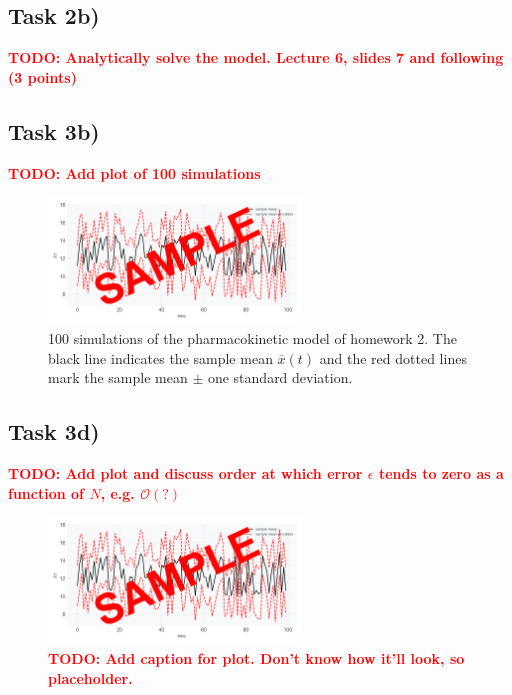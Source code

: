 \documentclass[]{scrartcl}
\begin{document}

\subsection*{Task 2b)}

\textbf{\textcolor{red}{TODO: Analytically solve the model. Lecture 6, slides 7 and following (3 points)}}




\clearpage
\subsection*{Task 3b)}

\textbf{\textcolor{red}{TODO: Add plot of 100 simulations}}

\begin{figure}[htbp!]
	\centering
	\includegraphics[width=0.6\textwidth]{Exercise3Homework3b.png}
	\caption{100 simulations of the pharmacokinetic model of homework 2.
			 The black line indicates the sample mean $\overline{x}(t)$ and the red dotted lines mark the sample mean $\pm$ one standard deviation.}
\end{figure}



\clearpage
\subsection*{Task 3d)}

\textbf{\textcolor{red}{TODO: Add plot and discuss order at which error $\epsilon$ tends to zero as a function of $N$, e.g. $\mathcal{O}(?)$}}

\begin{figure}[htbp!]
	\centering
	\includegraphics[width=0.6\textwidth]{Exercise3Homework3d.png}
	\caption{ \textbf{\textcolor{red}{TODO: Add caption for plot. Don't know how it'll look, so placeholder.}} }
\end{figure}
\end{document}

